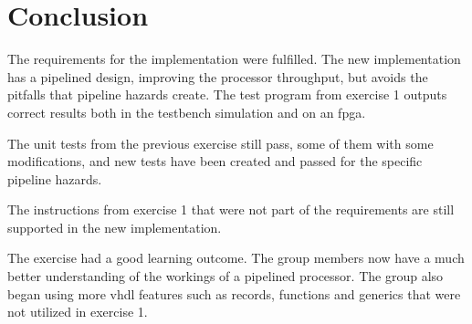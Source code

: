 \chapter{Conclusion}
The requirements for the implementation were fulfilled.
The new implementation has a pipelined design, improving the processor throughput,
but avoids the pitfalls that pipeline hazards create.
The test program from exercise 1 outputs correct results both in the testbench simulation and on an \gls{fpga}.

The unit tests from the previous exercise still pass, some of them with some modifications,
and new tests have been created and passed for the specific pipeline hazards.

The instructions from exercise 1 that were not part of the requirements are still supported in the new implementation.

The exercise had a good learning outcome.
The group members now have a much better understanding of the workings of a pipelined processor.
The group also began using more \gls{vhdl} features such as records, functions and generics that were not utilized in exercise 1.

